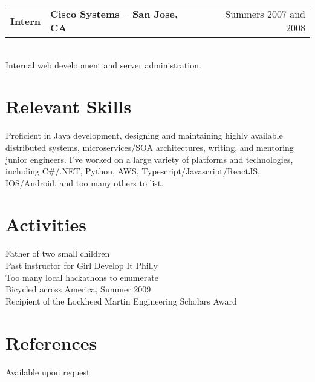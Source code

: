 \documentclass{res}
\newlength{\vsep}
\begin{document}
\begin{resume}
   \begin{tabularx}{\textwidth}{@{}>{\bf}l>{\large\bf\centering\arraybackslash}Xr@{}}
   Intern & Cisco Systems -- San Jose, CA & Summers 2007 and 2008\vspace{\vsep}\\
   \end{tabularx}\\
   Internal web development and server administration.


\section{Relevant Skills}
Proficient in Java development, designing and maintaining highly available distributed systems, microservices/SOA architectures, writing, and mentoring junior engineers.  I've worked on a large variety of platforms and technologies, including C\#/.NET, Python, AWS, Typescript/Javascript/ReactJS, IOS/Android, and too many others to list.
 
\section{Activities}
    Father of two small children\\
    Past instructor for Girl Develop It Philly\\
    Too many local hackathons to enumerate\\
    Bicycled across America, Summer 2009\\
    Recipient of the Lockheed Martin Engineering Scholars Award\\

\section{References}
    Available upon request

\end{resume}
\end{document}
